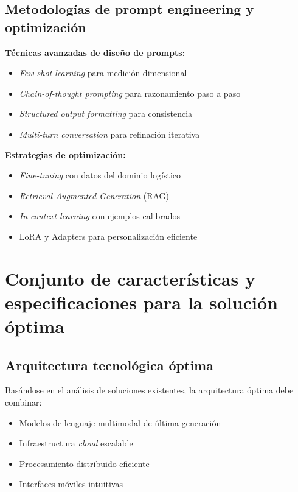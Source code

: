 \subsection{Metodologías de prompt engineering y optimización}

\textbf{Técnicas avanzadas de diseño de prompts:}
\begin{itemize}
    \item \textit{Few-shot learning} para medición dimensional
    \item \textit{Chain-of-thought prompting} para razonamiento paso a paso
    \item \textit{Structured output formatting} para consistencia
    \item \textit{Multi-turn conversation} para refinación iterativa
\end{itemize}

\textbf{Estrategias de optimización:}
\begin{itemize}
    \item \textit{Fine-tuning} con datos del dominio logístico
    \item \textit{Retrieval-Augmented Generation} (RAG)
    \item \textit{In-context learning} con ejemplos calibrados
    \item LoRA y Adapters para personalización eficiente
\end{itemize}

\section{Conjunto de características y especificaciones para la solución óptima}

\subsection{Arquitectura tecnológica óptima}

Basándose en el análisis de soluciones existentes, la arquitectura óptima debe combinar:

\begin{itemize}
    \item Modelos de lenguaje multimodal de última generación
    \item Infraestructura \textit{cloud} escalable
    \item Procesamiento distribuido eficiente
    \item Interfaces móviles intuitivas
\end{itemize}

